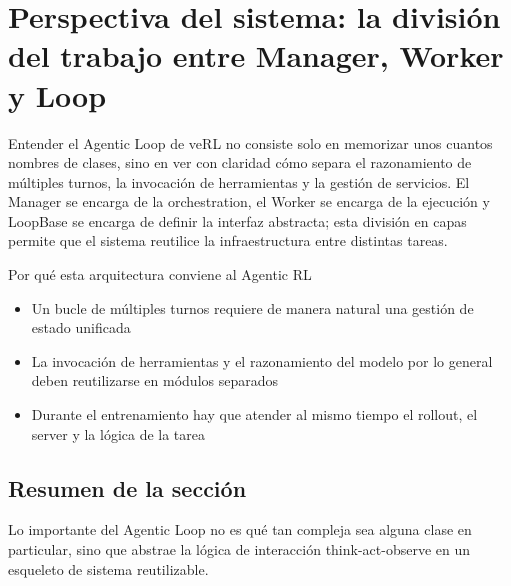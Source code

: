 \section{Perspectiva del sistema: la división del trabajo entre Manager, Worker y Loop}
Entender el Agentic Loop de veRL no consiste solo en memorizar unos cuantos nombres de clases, sino en ver con claridad cómo separa el razonamiento de múltiples turnos, la invocación de herramientas y la gestión de servicios. El Manager se encarga de la orchestration, el Worker se encarga de la ejecución y LoopBase se encarga de definir la interfaz abstracta; esta división en capas permite que el sistema reutilice la infraestructura entre distintas tareas.

\begin{knowledgebox}{Por qué esta arquitectura conviene al Agentic RL}
\begin{itemize}
  \item Un bucle de múltiples turnos requiere de manera natural una gestión de estado unificada
  \item La invocación de herramientas y el razonamiento del modelo por lo general deben reutilizarse en módulos separados
  \item Durante el entrenamiento hay que atender al mismo tiempo el rollout, el server y la lógica de la tarea
\end{itemize}
\end{knowledgebox}

\subsection{Resumen de la sección}
Lo importante del Agentic Loop no es qué tan compleja sea alguna clase en particular, sino que abstrae la lógica de interacción think-act-observe en un esqueleto de sistema reutilizable.

\newpage
